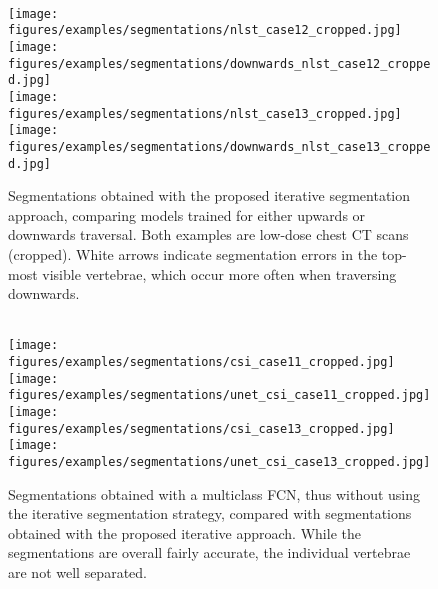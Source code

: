 \documentclass[authoryear,5p,final,times]{elsarticle}
\begin{document}
	\begin{figure*}[t]
    	\begin{minipage}[t]{0.49\textwidth}
    	    \centering%
    	    \begin{minipage}[t]{\columnwidth}
        		\footnotesize\centering%
                \hspace{1ex}%
        	\end{minipage}\\[1ex]%
    		\texttt{[image: figures/examples/segmentations/nlst\_case12\_cropped.jpg]}%
            \hspace{1ex}%
            \texttt{[image: figures/examples/segmentations/downwards\_nlst\_case12\_cropped.jpg]}\\[1.5ex]%
    		\texttt{[image: figures/examples/segmentations/nlst\_case13\_cropped.jpg]}%
            \hspace{1ex}%
    		\texttt{[image: figures/examples/segmentations/downwards\_nlst\_case13\_cropped.jpg]}%
    		\caption{Segmentations obtained with the proposed iterative segmentation approach, comparing models trained for either upwards or downwards traversal. Both examples are low-dose chest CT scans (cropped). White arrows indicate segmentation errors in the top-most visible vertebrae, which occur more often when traversing downwards.}
    		\label{fig:examples_downwards_traversal}
    	\end{minipage}%
    	\hfill%
    	\begin{minipage}[t]{0.49\textwidth}
    	    \centering%
    	    \begin{minipage}[t]{\columnwidth}
        		\footnotesize\centering%
        		\hspace{1ex}%
        	\end{minipage}\\[1ex]%
    		\texttt{[image: figures/examples/segmentations/csi\_case11\_cropped.jpg]}%
    		\hspace{1ex}%
    		\texttt{[image: figures/examples/segmentations/unet\_csi\_case11\_cropped.jpg]}\\[1.5ex]%
    		\texttt{[image: figures/examples/segmentations/csi\_case13\_cropped.jpg]}%
    		\hspace{1ex}%
    		\texttt{[image: figures/examples/segmentations/unet\_csi\_case13\_cropped.jpg]}\\[1ex]%
    		\caption{Segmentations obtained with a multiclass FCN, thus without using the iterative segmentation strategy, compared with segmentations obtained with the proposed iterative approach. While the segmentations are overall fairly accurate, the individual vertebrae are not well separated.}
            \label{fig:examples_unet}
    	\end{minipage}
	\end{figure*}
\end{document}
